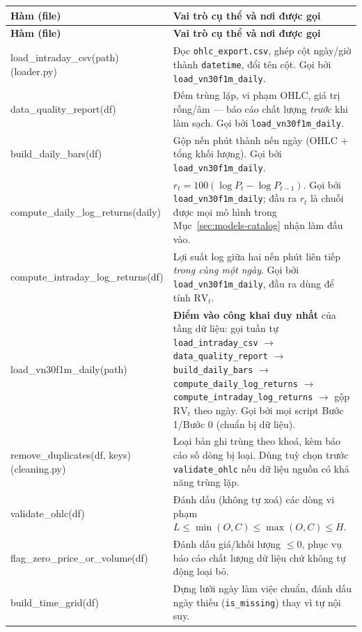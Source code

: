 \documentclass[11pt,a4paper]{article}
\newcommand{\code}[1]{\texttt{#1}}
\newcommand{\file}[1]{\texttt{#1}}
\begin{document}
\begin{longtable}{@{}>{\ttfamily\scriptsize\raggedright\arraybackslash}p{5.0cm} >{\raggedright\arraybackslash}p{9.5cm}@{}}
\toprule
\textbf{\normalfont Hàm (file)} & \textbf{Vai trò cụ thể và nơi được gọi} \\
\midrule
\endfirsthead
\toprule
\textbf{\normalfont Hàm (file)} & \textbf{Vai trò cụ thể và nơi được gọi} \\
\midrule
\endhead
\bottomrule
\endfoot
load\_intraday\_csv(path) \newline \footnotesize{(loader.py)} & Đọc \file{ohlc\_export.csv}, ghép cột ngày/giờ thành \code{datetime}, đổi tên cột. Gọi bởi \code{load\_vn30f1m\_daily}. \\
data\_quality\_report(df) & Đếm trùng lặp, vi phạm OHLC, giá trị rỗng/âm --- báo cáo chất lượng \emph{trước} khi làm sạch. Gọi bởi \code{load\_vn30f1m\_daily}. \\
build\_daily\_bars(df) & Gộp nến phút thành nến ngày (OHLC + tổng khối lượng). Gọi bởi \code{load\_vn30f1m\_daily}. \\
compute\_daily\_log\_returns(daily) & $r_t=100(\log P_t-\log P_{t-1})$. Gọi bởi \code{load\_vn30f1m\_daily}; đầu ra $r_t$ là chuỗi được mọi mô hình trong Mục~\ref{sec:models-catalog} nhận làm đầu vào. \\
compute\_intraday\_log\_returns(df) & Lợi suất log giữa hai nến phút liên tiếp \emph{trong cùng một ngày}. Gọi bởi \code{load\_vn30f1m\_daily}, đầu ra dùng để tính $\mathrm{RV}_t$. \\
load\_vn30f1m\_daily(path) & \textbf{Điểm vào công khai duy nhất} của tầng dữ liệu: gọi tuần tự \code{load\_intraday\_csv} $\to$ \code{data\_quality\_report} $\to$ \code{build\_daily\_bars} $\to$ \code{compute\_daily\_log\_returns} $\to$ \code{compute\_intraday\_log\_returns} $\to$ gộp $\mathrm{RV}_t$ theo ngày. Gọi bởi mọi script Bước 1/Bước 0 (chuẩn bị dữ liệu). \\
remove\_duplicates(df, keys) \newline \footnotesize{(cleaning.py)} & Loại bản ghi trùng theo khoá, kèm báo cáo số dòng bị loại. Dùng tuỳ chọn trước \code{validate\_ohlc} nếu dữ liệu nguồn có khả năng trùng lặp. \\
validate\_ohlc(df) & Đánh dấu (không tự xoá) các dòng vi phạm $L\le\min(O,C)\le\max(O,C)\le H$. \\
flag\_zero\_price\_or\_volume(df) & Đánh dấu giá/khối lượng $\le 0$, phục vụ báo cáo chất lượng dữ liệu chứ không tự động loại bỏ. \\
build\_time\_grid(df) & Dựng lưới ngày làm việc chuẩn, đánh dấu ngày thiếu (\code{is\_missing}) thay vì tự nội suy. \\

\end{longtable}
\end{document}
